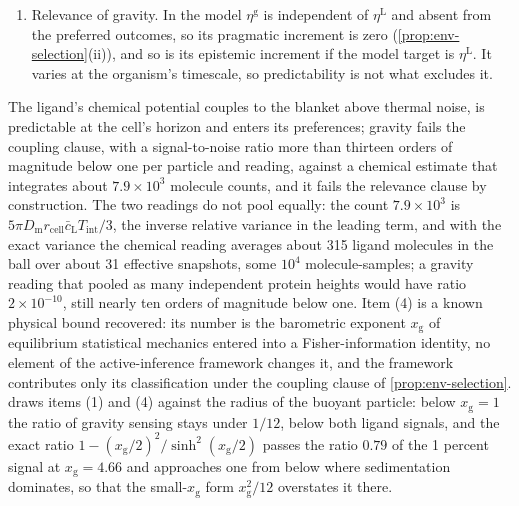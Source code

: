 \begin{example}
\begin{enumerate}
\item[(5)] Relevance of gravity. In the model $\eta^{\mathrm g}$ is independent of $\eta^{\mathrm L}$ and absent from the preferred outcomes, so its pragmatic increment is zero (\cref{prop:env-selection}(ii)), and so is its epistemic increment if the model target is $\eta^{\mathrm L}$. It varies at the organism's timescale, so predictability is not what excludes it.
\end{enumerate}
The ligand's chemical potential couples to the blanket above thermal noise, is predictable at the cell's horizon and enters its preferences; gravity fails the coupling clause, with a signal-to-noise ratio more than thirteen orders of magnitude below one per particle and reading, against a chemical estimate that integrates about $7.9\times10^3$ molecule counts, and it fails the relevance clause by construction. The two readings do not pool equally: the count $7.9\times10^3$ is $5\pi D_{\mathrm m}r_{\mathrm{cell}}\bar c_{\mathrm L}T_{\mathrm{int}}/3$, the inverse relative variance in the leading term, and with the exact variance the chemical reading averages about 315 ligand molecules in the ball over about 31 effective snapshots, some $10^4$ molecule-samples; a gravity reading that pooled as many independent protein heights would have ratio $2\times10^{-10}$, still nearly ten orders of magnitude below one. Item (4) is a known physical bound recovered: its number is the barometric exponent $x_{\mathrm g}$ of equilibrium statistical mechanics entered into a Fisher-information identity, no element of the active-inference framework changes it, and the framework contributes only its classification under the coupling clause of \cref{prop:env-selection}.  draws items (1) and (4) against the radius of the buoyant particle: below $x_{\mathrm g}=1$ the ratio of gravity sensing stays under $1/12$, below both ligand signals, and the exact ratio $1-(x_{\mathrm g}/2)^2/\sinh^2(x_{\mathrm g}/2)$ passes the ratio $0.79$ of the 1 percent signal at $x_{\mathrm g}=4.66$ and approaches one from below where sedimentation dominates, so that the small-$x_{\mathrm g}$ form $x_{\mathrm g}^2/12$ overstates it there.
\end{example}

